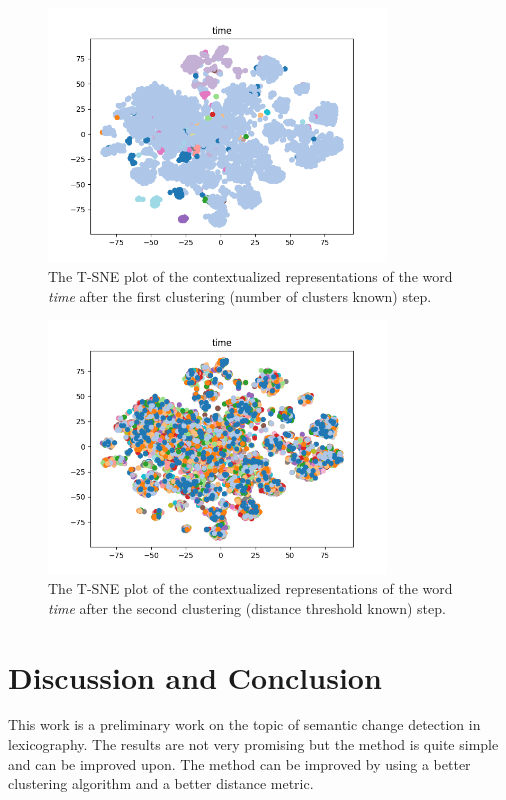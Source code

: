 \documentclass[11pt]{article}
\begin{document}
\begin{figure}
  \centering
  \includegraphics[width=0.8\textwidth]{time_1.png}
  \caption{The T-SNE plot of the contextualized representations of the word \textit{time} after the first clustering (number of clusters known) step.}
  \label{fig:time_1}
\end{figure}

\begin{figure}
  \centering
  \includegraphics[width=0.8\textwidth]{time_2.png}
  \caption{The T-SNE plot of the contextualized representations of the word \textit{time} after the second clustering (distance threshold known) step.}
  \label{fig:time_2}
\end{figure}

\section{Discussion and Conclusion}

This work is a preliminary work on the topic of semantic change detection in lexicography.
The results are not very promising but the method is quite simple and can be improved upon.
The method can be improved by using a better clustering algorithm and a better distance metric.
\end{document}
